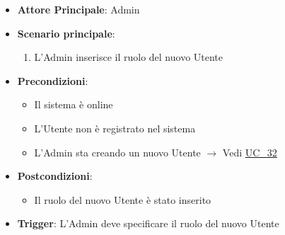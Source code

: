 \label{uc_32.1}

\begin{itemize}
    \item \textbf{Attore Principale}: Admin
	\item \textbf{Scenario principale}:
	\begin{enumerate}
		\item L'Admin inserisce il ruolo del nuovo Utente
	\end{enumerate}
	\item \textbf{Precondizioni}:
	\begin{itemize}
        \item Il sistema è online
        \item L'Utente non è registrato nel sistema
		\item L'Admin sta creando un nuovo Utente $\rightarrow$ Vedi \hyperref[uc_32]{UC\_32}
	\end{itemize}
	\item \textbf{Postcondizioni}:
	\begin{itemize}
		\item Il ruolo del nuovo Utente è stato inserito
	\end{itemize}
	\item \textbf{Trigger}: L'Admin deve specificare il ruolo del nuovo Utente
\end{itemize}

\label{uc_32.2}

